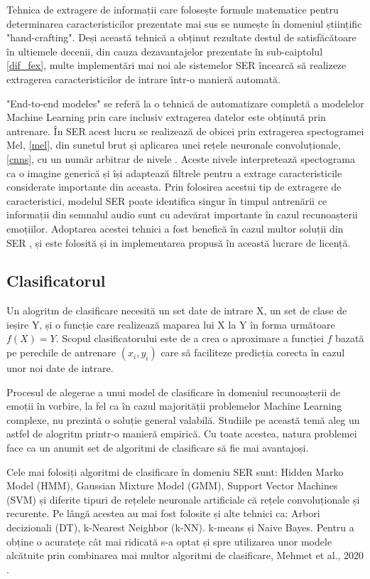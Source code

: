 \documentclass[a4paper,12pt]{book}
\begin{document}
						Tehnica de extragere de informații care folosește formule matematice pentru determinarea caracteristicilor prezentate mai sus se numește în domeniul științific "hand-crafting". Deși această tehnică a obținut rezultate destul de satisfăcătoare în ultiemele decenii, din cauza dezavantajelor prezentate în sub-caiptolul \ref{dif_fex}, multe implementări mai noi ale sistemelor SER încearcă să realizeze extragerea caracteristicilor de intrare într-o manieră automată. \par 
						
						"End-to-end modeles" se referă la o tehnică de automatizare completă a modelelor Machine Learning prin care inclusiv extragerea datelor este obținută prin antrenare. În SER acest lucru se realizează de obicei prin extragerea spectogramei Mel, \ref{mel}, din sunetul brut și aplicarea unei rețele neuronale convoluționale, \ref{cnns}, cu un număr arbitrar de nivele \cite{graves,tzir}. Aceste nivele interpretează spectograma ca o imagine generică și își adaptează filtrele pentru a extrage caracteristicile considerate importante din aceasta. Prin folosirea acestui tip de extragere de caracteristici, modelul SER poate identifica singur în timpul antrenării ce informații din semnalul audio sunt cu adevărat importante în cazul recunoașterii emoțiilor. Adoptarea acestei tehnici a fost benefică în cazul multor soluții din SER \cite{graves, tzir, zhang, yuan, adieu, e2e}, și este folosită și in implementarea propusă în această lucrare de licență.
					\subsection{Clasificatorul}
						Un alogritm de clasificare necesită un set date de intrare X, un set de clase de ieșire Y, și o funcție care realizează maparea lui X la Y în forma următoare \(f(X)=Y\). Scopul clasificatorului este de a crea o aproximare a funcției \(f\) bazată pe perechile de antrenare $(x_i,y_i)$ care să faciliteze predicția corecta în cazul unor noi date de intrare. \par
						
						Procesul de alegerae a unui model de clasificare în domeniul recunoașterii de emoții în vorbire, la fel ca în cazul majorității problemelor Machine Learning complexe, nu prezintă o soluție general valabilă. Studiile pe această temă aleg un astfel de alogritm printr-o manieră empirică. Cu toate acestea, natura problemei face ca un anumit set de algoritmi de clasificare să fie mai avantajoși.\par 
						Cele mai folosiți algoritmi de clasificare în domeniu SER sunt: Hidden Marko Model (HMM), Gaussian Mixture Model (GMM), Support Vector Machines (SVM) și diferite tipuri de rețelele neuronale artificiale că rețele convoluționale și recurente. Pe lângă acestea au mai fost folosite și alte tehnici ca: Arbori decizionali (DT), k-Nearest Neighbor (k-NN). k-means și Naive Bayes. Pentru a obține o acuratețe cât mai ridicată s-a optat și spre utilizarea unor modele alcătuite prin combinarea mai multor algoritmi de clasificare, Mehmet et al., 2020 \cite{mehmet}.
							
\end{document}
